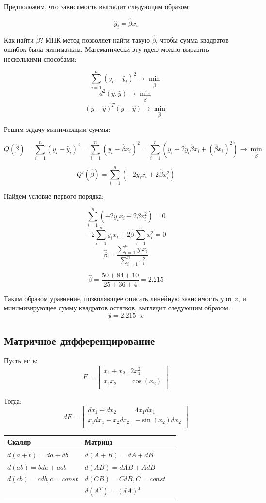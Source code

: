 \documentclass[12pt]{article} %
\theoremstyle{definition} %
\def \hb{\hat{\beta}}
\def \hy{\hat{y}}
\begin{document}
Предположим, что зависимость выглядит следующим образом:

\[
\hy_i = \hb x_i
\]

Как найти $\hb$? МНК метод позволяет найти такую $\hb$, чтобы сумма квадратов ошибок была минимальна. Математически эту идею можно выразить несколькими способами:

\[
\sum_{i=1}^n \left( y_i - \hy_i \right)^2 \rightarrow \underset{\hb}{\min}
\]
\[
d^2(y,\hy) \rightarrow \underset{\hb}{\min}
\]
\[
\left( y-\hy\right)^T\left( y-\hy\right) \rightarrow \underset{\hb}{\min}
\]

Решим задачу минимизации суммы:

\[
Q(\hb) = \sum_{i=1}^n \left( y_i - \hy_i \right)^2 =
\sum_{i=1}^n \left( y_i - \hb x_i \right)^2 =
\sum_{i=1}^n \left( y_i - 2y_i\hb x_i + (\hb x_i)^2 \right)\rightarrow \underset{\hb}{\min}
\]

\[
Q'(\hb) = \sum_{i=1}^n \left( - 2y_i x_i + 2\hb x_i^2 \right)
\]

Найдем условие первого порядка:

\[
\sum_{i=1}^n \left( - 2y_i x_i + 2\hb x_i^2 \right) = 0
\]
\[
-2\sum_{i=1}^n y_i x_i + 2\hb \sum_{i=1}^n x_i^2  = 0
\]
\[
\hb   = \frac{\sum_{i=1}^n y_i x_i}{\sum_{i=1}^n x_i^2}
\]

\[
\hb   = \frac{50+84+10}{25+36+4} = 2.215
\]

Таким образом уравнение, позволяющее описать линейную зависимость $y$ от $x$, и минимизирующее сумму квадратов остатков, выглядит следующим образом:
\[
\hy = 2.215\cdot x
\]

\subsection{Матричное дифференцирование}

Пусть есть:
\[
F =  \begin{bmatrix}
        x_1 + x_2  & 2x_1^2 \\
        x_1x_2    & \cos(x_2)\\
         \end{bmatrix}
\]

Тогда:
\[
dF =  \begin{bmatrix}
        dx_1 + dx_2  & 4x_1dx_1 \\
        x_1dx_1+x_2dx_2    & -\sin(x_2)dx_2\\
         \end{bmatrix}
\]

\begin{center}
\begin{tabular}{lll}
\toprule
Скаляр & Матрица  \\
\midrule
$d(a+b) = da + db$ & $d(A+B) = dA + dB$\\
$d(ab) = bda + adb$ & $d(AB) = dAB + AdB$\\
$d(cb) = cdb, c=const$ & $d(CB) = CdB, C=const$ \\
 & $d(A^T)=(dA)^T$\\
\bottomrule
\end{tabular}
\end{center}
\end{document}
